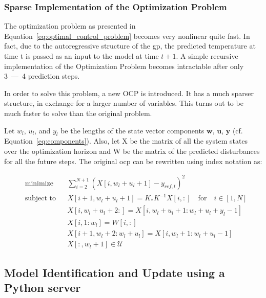 \subsubsection{Sparse Implementation of the Optimization Problem}

The optimization problem as presented in
Equation~\ref{eq:optimal_control_problem} becomes very nonlinear quite fast. In
fact, due to the autoregressive structure of the \acrshort{gp}, the predicted
temperature at time t is passed as an input to the model at time $t+1$. A simple
recursive implementation of the Optimization Problem becomes intractable after
only 3~---~4 prediction steps. 

In order to solve this problem, a new OCP is introduced. It has a much sparser
structure, in exchange for a larger number of variables. This turns out to be
much faster to solve than the original problem.

Let $w_l$, $u_l$, and $y_l$ be the lengths of the state vector components
$\mathbf{w}$, $\mathbf{u}$, $\mathbf{y}$ (cf. Equation~\ref{eq:components}).
Also, let X be the matrix of all the system states over the optimization horizon
and W be the matrix of the predicted disturbances for all the future steps. The
original \acrlong{ocp} can be rewritten using index notation as:

\begin{subequations}\label{eq:sparse_optimal_control_problem}
    \begin{align}
        & \text{minimize}
        & & \sum_{i=2}^{N + 1} \left(X[i, w_l + u_l + 1] - y_{ref, t}\right)^2 \\
        & \text{subject to}
        & & X[i+1, w_l + u_l + 1] = K_*K^{-1}X[i, :] \quad \text{for} \quad
        i\in[1, N]\\
        &&& X[i, w_l + u_l + 2: ] = X[i, w_l+ u_l + 1: w_l + u_l + y_l - 1]\\
        &&& X[i, 1:w_l] = W[i, :] \\
        &&& X[i+1, w_l + 2: w_l + u_l] = X[i, w_l + 1: w_l + u_l - 1] \\
        &&& X[:, w_l + 1] \in \mathcal{U}
    \end{align}
\end{subequations}

\subsection{Model Identification and Update using a Python server}

